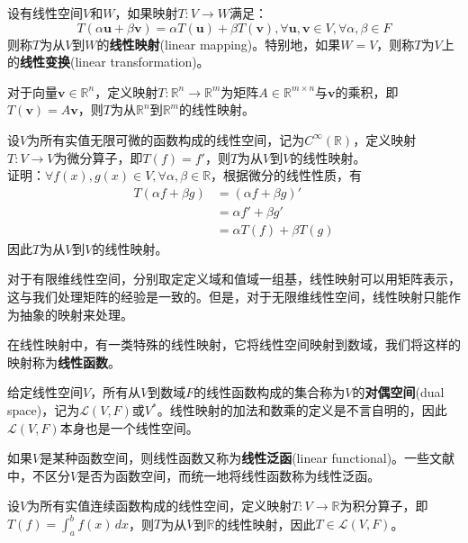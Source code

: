 \documentclass{ctexbook}
\begin{document}
\begin{definition}[线性映射]
    设有线性空间$V$和$W$，如果映射$T:V\to W$满足：
    \[T(\alpha \mathbf{u}+\beta \mathbf{v})=\alpha T(\mathbf{u})+\beta T(\mathbf{v}),\forall \mathbf{u},\mathbf{v}\in V,\forall \alpha,\beta\in F\]
    则称$T$为从$V$到$W$的\textbf{线性映射}(linear mapping)。特别地，如果$W=V$，则称$T$为$V$上的\textbf{线性变换}(linear transformation)。
\end{definition}

\begin{example}
    对于向量$\mathbf{v}\in\mathbb{R}^n$，定义映射$T:\mathbb{R}^n\to\mathbb{R}^m$为矩阵$A\in\mathbb{R}^{m\times n}$与$\mathbf{v}$的乘积，即$T(\mathbf{v})=A\mathbf{v}$，则$T$为从$\mathbb{R}^n$到$\mathbb{R}^m$的线性映射。
\end{example}

\begin{example}
    设$V$为所有实值无限可微的函数构成的线性空间，记为$C^\infty(\mathbb{R})$，定义映射$T:V\to V$为微分算子，即$T(f)=f'$，则$T$为从$V$到$V$的线性映射。\\
    证明：$\forall f(x),g(x)\in V,\forall \alpha,\beta\in \mathbb{R}$，根据微分的线性性质，有
    \begin{align*}
        T(\alpha f+\beta g)&=(\alpha f+\beta g)'\\
        &=\alpha f'+\beta g'\\
        &=\alpha T(f)+\beta T(g)
    \end{align*}
    因此$T$为从$V$到$V$的线性映射。
\end{example}

对于有限维线性空间，分别取定定义域和值域一组基，线性映射可以用矩阵表示，这与我们处理矩阵的经验是一致的。但是，对于无限维线性空间，线性映射只能作为抽象的映射来处理。

在线性映射中，有一类特殊的线性映射，它将线性空间映射到数域，我们将这样的映射称为\textbf{线性函数}。

\begin{definition}[对偶空间]
    给定线性空间$V$，所有从$V$到数域$F$的线性函数构成的集合称为$V$的\textbf{对偶空间}(dual space)，记为$\mathcal{L} (V,F)$或$V^*$。线性映射的加法和数乘的定义是不言自明的，因此$\mathcal{L} (V,F)$本身也是一个线性空间。

    如果$V$是某种函数空间，则线性函数又称为\textbf{线性泛函}(linear functional)。一些文献中，不区分$V$是否为函数空间，而统一地将线性函数称为线性泛函。
\end{definition}
\begin{example}
    设$V$为所有实值连续函数构成的线性空间，定义映射$T:V\to \mathbb{R}$为积分算子，即$T(f)=\int_{a}^{b}f(x)\,dx$，则$T$为从$V$到$\mathbb{R}$的线性映射，因此$T\in \mathcal{L} (V,F)$。
\end{example}
\end{document}

